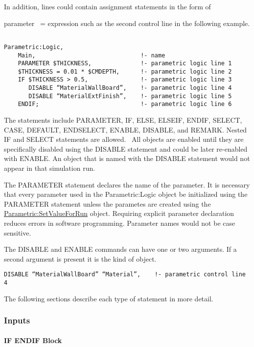In addition, lines could contain assignment statements in the form of

parameter~ = expression such as the second control line in the following example.

\begin{lstlisting}

Parametric:Logic,
    Main,                              !- name
    PARAMETER $THICKNESS,              !- parametric logic line 1
    $THICKNESS = 0.01 * $CMDEPTH,      !- parametric logic line 2
    IF $THICKNESS > 0.5,               !- parametric logic line 3
       DISABLE “MaterialWallBoard”,    !- parametric logic line 4
       DISABLE “MaterialExtFinish”,    !- parametric logic line 5
    ENDIF;                             !- parametric logic line 6
\end{lstlisting}

The statements include PARAMETER, IF, ELSE, ELSEIF, ENDIF, SELECT, CASE, DEFAULT, ENDSELECT, ENABLE, DISABLE, and REMARK. Nested IF and SELECT statements are allowed.~ All objects are enabled until they are specifically disabled using the DISABLE statement and could be later re-enabled with ENABLE. An object that is named with the DISABLE statement would not appear in that simulation run.

The PARAMETER statement declares the name of the parameter. It is necessary that every parameter used in the Parametric:Logic object be initialized using the PARAMETER statement unless the parametes are created using the \hyperref[parametricsetvalueforrun]{Parametric:SetValueForRun} object. Requiring explicit parameter declaration reduces errors in software programming. Parameter names would not be case sensitive.

The DISABLE and ENABLE commands can have one or two arguments. If a second argument is present it is the kind of object.

\begin{lstlisting}
DISABLE “MaterialWallBoard” “Material”,    !- parametric control line 4
\end{lstlisting}

The following sections describe each type of statement in more detail.

\subsubsection{Inputs}\label{inputs-1-027}

\paragraph{IF ENDIF Block}\label{if-endif-block}

